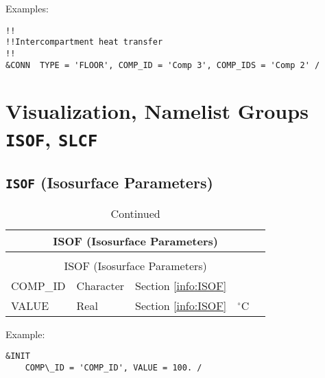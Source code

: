 
\vspace{\baselineskip}
\noindent Examples:
\begin{lstlisting}
!!
!!Intercompartment heat transfer
!!
&CONN  TYPE = 'FLOOR', COMP_ID = 'Comp 3', COMP_IDS = 'Comp 2' /
\end{lstlisting}




\clearpage
\section{Visualization, Namelist Groups \texorpdfstring{{\tt ISOF}}{ISOF}, \texorpdfstring{{\tt SLCF}}{SLCF}}

\subsection{\texorpdfstring{{\tt ISOF}}{ISOF} (Isosurface Parameters)}

\begin{longtable}{@{\extracolsep{\fill}}|l|l|l|l|l|}
\caption[Isosurface parameters ({\ct ISOF} namelist group)]{For more information see Section~\ref{info:ISOF}.}
\label{tbl:ISOF} \\
\hline
\multicolumn{5}{|c|}{{\ct ISOF} (Isosurface Parameters)} \\
\hline \hline
\endfirsthead
\caption[]{Continued} \\
\hline
\multicolumn{5}{|c|}{{\ct ISOF} (Isosurface Parameters)} \\
\hline \hline
\endhead
{\ct COMP\_ID}        & Character   & Section \ref{info:ISOF}                 &           &                 \\ \hline
{\ct VALUE}             & Real        & Section \ref{info:ISOF}                 & $^\circ$C &                 \\ \hline
\end{longtable}

\noindent Example:
\begin{lstlisting}
&INIT
	COMP\_ID = 'COMP_ID', VALUE = 100. /
\end{lstlisting}




